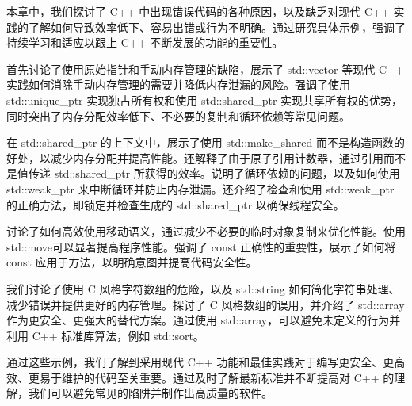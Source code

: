 本章中，我们探讨了 C++ 中出现错误代码的各种原因，以及缺乏对现代 C++ 实践的了解如何导致效率低下、容易出错或行为不明确。通过研究具体示例，强调了持续学习和适应以跟上 C++ 不断发展的功能的重要性。

首先讨论了使用原始指针和手动内存管理的缺陷，展示了 std::vector 等现代 C++ 实践如何消除手动内存管理的需要并降低内存泄漏的风险。强调了使用 std::unique\_ptr 实现独占所有权和使用 std::shared\_ptr 实现共享所有权的优势，同时突出了内存分配效率低下、不必要的复制和循环依赖等常见问题。

在 std::shared\_ptr 的上下文中，展示了使用 std::make\_shared 而不是构造函数的好处，以减少内存分配并提高性能。还解释了由于原子引用计数器，通过引用而不是值传递 std::shared\_ptr 所获得的效率。说明了循环依赖的问题，以及如何使用 std::weak\_ptr 来中断循环并防止内存泄漏。还介绍了检查和使用 std::weak\_ptr 的正确方法，即锁定并检查生成的 std::shared\_ptr 以确保线程安全。

讨论了如何高效使用移动语义，通过减少不必要的临时对象复制来优化性能。使用 std::move可以显著提高程序性能。强调了 const 正确性的重要性，展示了如何将 const 应用于方法，以明确意图并提高代码安全性。

我们讨论了使用 C 风格字符数组的危险，以及 std::string 如何简化字符串处理、减少错误并提供更好的内存管理。探讨了 C 风格数组的误用，并介绍了 std::array 作为更安全、更强大的替代方案。通过使用 std::array，可以避免未定义的行为并利用 C++ 标准库算法，例如 std::sort。

通过这些示例，我们了解到采用现代 C++ 功能和最佳实践对于编写更安全、更高效、更易于维护的代码至关重要。通过及时了解最新标准并不断提高对 C++ 的理解，我们可以避免常见的陷阱并制作出高质量的软件。
